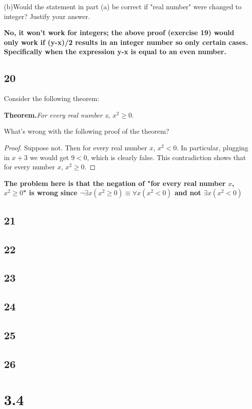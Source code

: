 \documentclass{article}
\begin{document}
(b)Would the statement in part (a) be correct if "real number" were changed to integer? Justify your answer.

\textbf{No, it won't work for integers; the above proof (exercise 19) would only work if (y-x)/2 results in an integer number so only certain cases. Specifically when the expression y-x is equal to an even number.}
\subsection{20}
Consider the following theorem:

\textbf{Theorem.}\textit{For every real number x, $x^2\geq 0$}.

What's wrong with the following proof of the theorem?

\begin{proof}
Suppose not. Then for every real number $x$, $x^2<0$. In particular, plugging in $x + 3$ we would get $9<0$, which is clearly false. This contradiction shows that for every number $x$, $x^2 \geq 0$. 
\end{proof} 

\textbf{The problem here is that the negation of "for every real number $x$, $x^2\geq 0$" is wrong since $\neg \exists x (x^2\geq 0) \equiv \forall x (x^2<0)$ and not $\exists x (x^2<0)$}
\subsection{21}

\subsection{22}
\subsection{23}
\subsection{24}
\subsection{25}
\subsection{26}
\newpage
\section{3.4}
\end{document}
